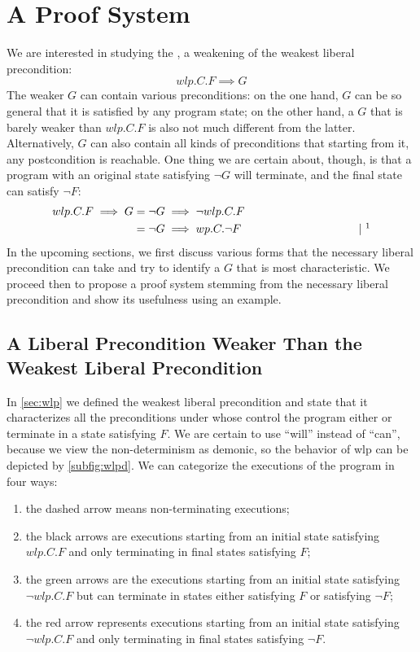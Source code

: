 \chapter{A Proof System}\label{ch:system} %

We are interested in studying the , a weakening of the weakest liberal precondition: 
$$wlp.C.F\implies G$$
The weaker $G$ can contain various preconditions: on the one hand, $G$ can be so general that it is satisfied by any program state; on the other hand, a $G$ that is barely weaker than $wlp.C.F$ is also not much different from the latter. 
Alternatively, $G$ can also contain all kinds of preconditions that starting from it, any postcondition is reachable. 
One thing we are certain about, though, is that a program with an original state satisfying $\neg G$ will terminate, and the final state can satisfy $\neg F$: 
\begin{align*}
wlp.C.F\implies G & = \neg G \implies \neg wlp.C.F \\
	& = \neg G \implies wp.C.\neg F 
	\hspace{0.3\textwidth} | \ \todo{insert theorem: wlp and wp are conjugates} 
\end{align*}
In the upcoming sections, we first discuss various forms that the necessary liberal precondition can take and try to identify a $G$ that is most characteristic. 
We proceed then to propose a proof system stemming from the necessary liberal precondition and show its usefulness using an example.  

\section{A Liberal Precondition Weaker Than the Weakest Liberal Precondition }
In \autoref{sec:wlp} we defined the weakest liberal precondition and state that it characterizes all the preconditions under whose control the program either  or  terminate in a state satisfying $F$. 
We are certain to use ``will'' instead of ``can'', because we view the non-determinism as demonic, so the behavior of wlp can be depicted by \autoref{subfig:wlpd}. 
We can categorize the executions of the program in four ways: 
\begin{enumerate}
	\item the dashed arrow means non-terminating executions; 
	\item the black arrows are executions starting from an initial state satisfying $wlp.C.F$ and only terminating in final states satisfying $F$; 
	\item the green arrows are the executions starting from an initial state satisfying $\neg wlp.C.F$ but can terminate in states either satisfying $F$ or satisfying $\neg F$;
	\item the red arrow represents executions starting from an initial state satisfying $\neg wlp.C.F$ and only terminating in final states satisfying $\neg F$. 
\end{enumerate}

